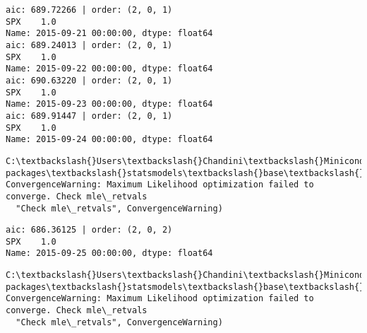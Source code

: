 \documentclass[11pt]{article}
\begin{document}
    \begin{Verbatim}[commandchars=\\\{\}]
aic: 689.72266 | order: (2, 0, 1)
SPX    1.0
Name: 2015-09-21 00:00:00, dtype: float64
aic: 689.24013 | order: (2, 0, 1)
SPX    1.0
Name: 2015-09-22 00:00:00, dtype: float64
aic: 690.63220 | order: (2, 0, 1)
SPX    1.0
Name: 2015-09-23 00:00:00, dtype: float64
aic: 689.91447 | order: (2, 0, 1)
SPX    1.0
Name: 2015-09-24 00:00:00, dtype: float64

    \end{Verbatim}

    \begin{Verbatim}[commandchars=\\\{\}]
C:\textbackslash{}Users\textbackslash{}Chandini\textbackslash{}Miniconda3\textbackslash{}envs\textbackslash{}auquan\textbackslash{}lib\textbackslash{}site-packages\textbackslash{}statsmodels\textbackslash{}base\textbackslash{}model.py:496: ConvergenceWarning: Maximum Likelihood optimization failed to converge. Check mle\_retvals
  "Check mle\_retvals", ConvergenceWarning)

    \end{Verbatim}

    \begin{Verbatim}[commandchars=\\\{\}]
aic: 686.36125 | order: (2, 0, 2)
SPX    1.0
Name: 2015-09-25 00:00:00, dtype: float64

    \end{Verbatim}

    \begin{Verbatim}[commandchars=\\\{\}]
C:\textbackslash{}Users\textbackslash{}Chandini\textbackslash{}Miniconda3\textbackslash{}envs\textbackslash{}auquan\textbackslash{}lib\textbackslash{}site-packages\textbackslash{}statsmodels\textbackslash{}base\textbackslash{}model.py:496: ConvergenceWarning: Maximum Likelihood optimization failed to converge. Check mle\_retvals
  "Check mle\_retvals", ConvergenceWarning)

    \end{Verbatim}
\end{document}
